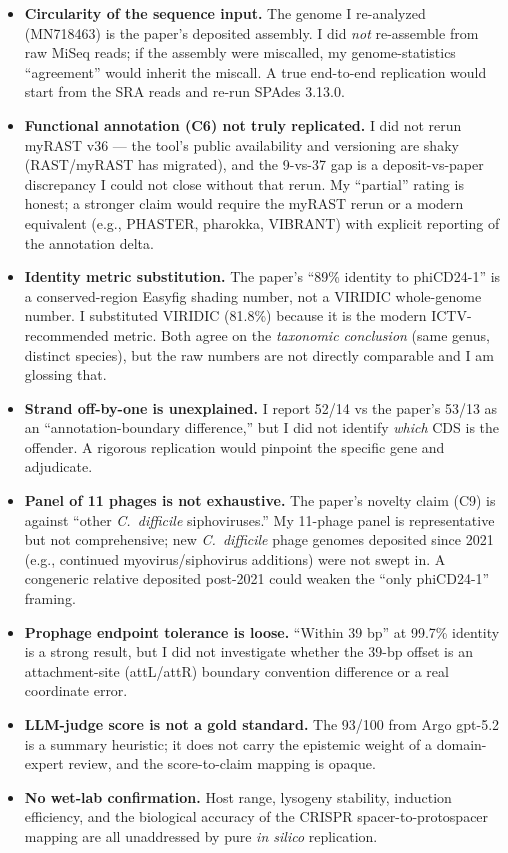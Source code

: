 \documentclass[11pt]{article}
\begin{document}
\begin{itemize}[leftmargin=1.5em]
  \item \textbf{Circularity of the sequence input.} The genome I re-analyzed
        (MN718463) is the paper's deposited assembly. I did \emph{not}
        re-assemble from raw MiSeq reads; if the assembly were miscalled,
        my genome-statistics ``agreement'' would inherit the miscall.
        A true end-to-end replication would start from the SRA reads and
        re-run SPAdes 3.13.0.
  \item \textbf{Functional annotation (C6) not truly replicated.} I did not
        rerun myRAST v36 --- the tool's public availability and versioning
        are shaky (RAST/myRAST has migrated), and the 9-vs-37 gap is a
        deposit-vs-paper discrepancy I could not close without that rerun.
        My ``partial'' rating is honest; a stronger claim would require the
        myRAST rerun or a modern equivalent (e.g., PHASTER, pharokka, VIBRANT)
        with explicit reporting of the annotation delta.
  \item \textbf{Identity metric substitution.} The paper's ``89\% identity to
        phiCD24-1'' is a conserved-region Easyfig shading number, not a
        VIRIDIC whole-genome number. I substituted VIRIDIC (81.8\%) because
        it is the modern ICTV-recommended metric. Both agree on the
        \emph{taxonomic conclusion} (same genus, distinct species), but the
        raw numbers are not directly comparable and I am glossing that.
  \item \textbf{Strand off-by-one is unexplained.} I report 52/14 vs the
        paper's 53/13 as an ``annotation-boundary difference,'' but I did
        not identify \emph{which} CDS is the offender. A rigorous
        replication would pinpoint the specific gene and adjudicate.
  \item \textbf{Panel of 11 phages is not exhaustive.} The paper's novelty
        claim (C9) is against ``other \emph{C.\ difficile} siphoviruses.''
        My 11-phage panel is representative but not comprehensive; new
        \emph{C.\ difficile} phage genomes deposited since 2021 (e.g.,
        continued myovirus/siphovirus additions) were not swept in.
        A congeneric relative deposited post-2021 could weaken the
        ``only phiCD24-1'' framing.
  \item \textbf{Prophage endpoint tolerance is loose.} ``Within 39 bp'' at
        99.7\% identity is a strong result, but I did not investigate
        whether the 39-bp offset is an attachment-site (attL/attR)
        boundary convention difference or a real coordinate error.
  \item \textbf{LLM-judge score is not a gold standard.} The 93/100 from
        Argo gpt-5.2 is a summary heuristic; it does not carry the
        epistemic weight of a domain-expert review, and the score-to-claim
        mapping is opaque.
  \item \textbf{No wet-lab confirmation.} Host range, lysogeny stability,
        induction efficiency, and the biological accuracy of the CRISPR
        spacer-to-protospacer mapping are all unaddressed by pure
        \emph{in silico} replication.
\end{itemize}
\end{document}
